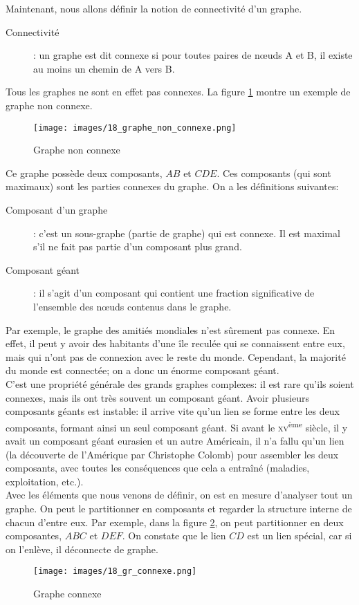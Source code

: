 Maintenant, nous allons définir la notion de connectivité d'un graphe.
	\begin{description}
    	\item[Connectivité]: un graphe est dit connexe si pour toutes paires de n\oe uds A et B, il existe au moins un chemin de A vers B.\\
	\end{description}

Tous les graphes ne sont en effet pas connexes. La figure \ref{graphe_non_connexe} montre un exemple de graphe non connexe.
	\begin{figure}
	\center
	\texttt{[image: images/18\_graphe\_non\_connexe.png]}
	\caption{\label{graphe_non_connexe} Graphe non connexe}
	\end{figure}
Ce graphe possède deux composants, $AB$ et $CDE$. Ces composants (qui sont maximaux) sont les parties connexes du graphe. On a les définitions suivantes:
	\begin{description}
    \item[Composant d'un graphe]: c'est un sous-graphe (partie de graphe) qui est connexe. Il est maximal s'il ne fait pas partie d'un composant plus grand.
    \item[Composant géant] : il s'agit d'un composant qui contient une fraction significative de l'ensemble des n\oe uds contenus dans le graphe.
    \end{description}
    
    Par exemple, le graphe des amitiés mondiales n'est sûrement pas connexe. En effet, il peut y avoir des habitants d'une île reculée qui se connaissent entre eux, mais qui n'ont pas de connexion avec le reste du monde. Cependant, la majorité du monde est connectée; on a donc un énorme composant géant.\\
    
    C'est une propriété générale des grands graphes complexes: il est rare qu'ils soient connexes, mais ils ont très souvent un composant géant. Avoir plusieurs composants géants est instable: il arrive vite qu'un lien se forme entre les deux composants, formant ainsi un seul composant géant. Si avant le \textsc{xv}\textsuperscript{ème} siècle, il y avait un composant géant eurasien et un autre Américain, il n'a fallu qu'un lien (la découverte de l'Amérique par Christophe Colomb) pour assembler les deux composants, avec toutes les conséquences que cela a entraîné (maladies, exploitation, etc.).\\
    
Avec les éléments que nous venons de définir, on est en mesure d'analyser tout un graphe. On peut le partitionner en composants et regarder la structure interne de chacun d'entre eux. Par exemple, dans la figure \ref{gr_connexe}, on peut partitionner en deux composantes, $ABC$ et $DEF$. On constate que le lien $CD$ est un lien spécial, car si on l'enlève, il déconnecte de graphe.\\
	\begin{figure}
	\center
	\texttt{[image: images/18\_gr\_connexe.png]}
	\caption{\label{gr_connexe} Graphe connexe}
	\end{figure}

